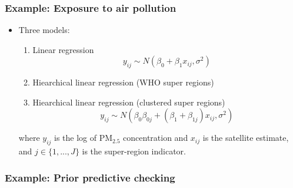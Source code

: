 \documentclass[10pt]{beamer}
\begin{document}
\begin{frame}

\frametitle{Example: Exposure to air pollution}

  \begin{itemize}
  \item Three models:
  \begin{enumerate}
  \item Linear regression
  \[
  y_{ij} \sim N(\beta_0 + \beta_1 x_{ij}, \sigma^2)
  \]
  \item Hiearchical linear regression (WHO super regions)
  \item Hiearchical linear regression (clustered super regions)
  \[
  y_{ij} \sim N(\beta_0 \beta_{0j} + (\beta_1 + \beta_{1j}) x_{ij}, \sigma^2)
  \]
  \end{enumerate}
  where $y_{ij}$ is the log of $\text{PM}_{2.5}$ concentration and $x_{ij}$ is the satellite estimate, and $j \in \{1,...,J \}$ is the super-region indicator.
  \end{itemize}
\end{frame}


\begin{frame}

\frametitle{Example: Prior predictive checking}

  \begin{center}
\end{center}
\end{frame}
\end{document}
